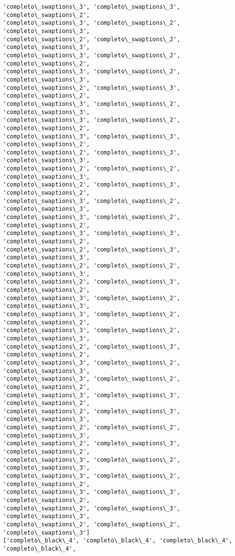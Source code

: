 \documentclass[11pt]{article}
\begin{document}
\begin{Verbatim}[commandchars=\\\{\}]
'completo\_swaptions\_3', 'completo\_swaptions\_3', 'completo\_swaptions\_2',
'completo\_swaptions\_3', 'completo\_swaptions\_2', 'completo\_swaptions\_3',
'completo\_swaptions\_2', 'completo\_swaptions\_2', 'completo\_swaptions\_3',
'completo\_swaptions\_3', 'completo\_swaptions\_2', 'completo\_swaptions\_2',
'completo\_swaptions\_3', 'completo\_swaptions\_2', 'completo\_swaptions\_3',
'completo\_swaptions\_2', 'completo\_swaptions\_3', 'completo\_swaptions\_2',
'completo\_swaptions\_3', 'completo\_swaptions\_2', 'completo\_swaptions\_3',
'completo\_swaptions\_3', 'completo\_swaptions\_2', 'completo\_swaptions\_2',
'completo\_swaptions\_3', 'completo\_swaptions\_3', 'completo\_swaptions\_2',
'completo\_swaptions\_2', 'completo\_swaptions\_3', 'completo\_swaptions\_3',
'completo\_swaptions\_2', 'completo\_swaptions\_2', 'completo\_swaptions\_3',
'completo\_swaptions\_2', 'completo\_swaptions\_3', 'completo\_swaptions\_2',
'completo\_swaptions\_3', 'completo\_swaptions\_2', 'completo\_swaptions\_3',
'completo\_swaptions\_3', 'completo\_swaptions\_2', 'completo\_swaptions\_2',
'completo\_swaptions\_3', 'completo\_swaptions\_3', 'completo\_swaptions\_2',
'completo\_swaptions\_2', 'completo\_swaptions\_3', 'completo\_swaptions\_3',
'completo\_swaptions\_2', 'completo\_swaptions\_2', 'completo\_swaptions\_3',
'completo\_swaptions\_2', 'completo\_swaptions\_3', 'completo\_swaptions\_2',
'completo\_swaptions\_3', 'completo\_swaptions\_2', 'completo\_swaptions\_3',
'completo\_swaptions\_3', 'completo\_swaptions\_2', 'completo\_swaptions\_2',
'completo\_swaptions\_3', 'completo\_swaptions\_2', 'completo\_swaptions\_3',
'completo\_swaptions\_2', 'completo\_swaptions\_3', 'completo\_swaptions\_2',
'completo\_swaptions\_3', 'completo\_swaptions\_2', 'completo\_swaptions\_3',
'completo\_swaptions\_3', 'completo\_swaptions\_2', 'completo\_swaptions\_2',
'completo\_swaptions\_3', 'completo\_swaptions\_3', 'completo\_swaptions\_2',
'completo\_swaptions\_2', 'completo\_swaptions\_3', 'completo\_swaptions\_3',
'completo\_swaptions\_2', 'completo\_swaptions\_2', 'completo\_swaptions\_3',
'completo\_swaptions\_2', 'completo\_swaptions\_3', 'completo\_swaptions\_2',
'completo\_swaptions\_3', 'completo\_swaptions\_2', 'completo\_swaptions\_3',
'completo\_swaptions\_3', 'completo\_swaptions\_2', 'completo\_swaptions\_2',
'completo\_swaptions\_3', 'completo\_swaptions\_3', 'completo\_swaptions\_2',
'completo\_swaptions\_2', 'completo\_swaptions\_3', 'completo\_swaptions\_3',
'completo\_swaptions\_2', 'completo\_swaptions\_2', 'completo\_swaptions\_3']
['completo\_black\_4', 'completo\_black\_4', 'completo\_black\_4', 'completo\_black\_4',

\end{Verbatim}
\end{document}

